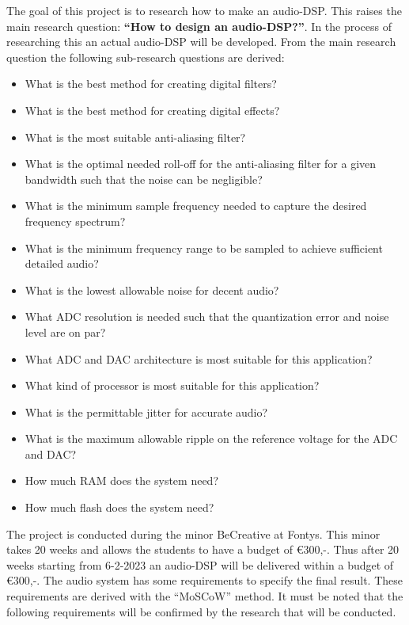 The goal of this project is to research how to make an audio-DSP. This raises the main research question: \textbf{“How to design an audio-DSP?”}. In the process of researching this an actual audio-DSP will be developed. From the main research question the following sub-research questions are derived:
\begin{itemize} %
	\setlength\itemsep{-0.2em} %
	\item What is the best method for creating digital filters?
	\item What is the best method for creating digital effects?
	\item What is the most suitable anti-aliasing filter?
	\item What is the optimal needed roll-off for the anti-aliasing filter for a given bandwidth such that the noise can be negligible?
	\item What is the minimum sample frequency needed to capture the desired frequency spectrum?
	\item What is the minimum frequency range to be sampled to achieve sufficient detailed audio?
	\item What is the lowest allowable noise for decent audio?
	\item What ADC resolution is needed such that the quantization error and noise level are on par?
	\item What ADC and DAC architecture is most suitable for this application?
	\item What kind of processor is most suitable for this application?
	\item What is the permittable jitter for accurate audio?
	\item What is the maximum allowable ripple on the reference voltage for the ADC and DAC?
	\item How much RAM does the system need?
	\item How much flash does the system need?\\
\end{itemize}

\noindent
The project is conducted during the minor BeCreative at Fontys. This minor takes 20 weeks and allows the students to have a budget of €300,-. Thus after 20 weeks starting from 6-2-2023 an audio-DSP will be delivered within a budget of €300,-.
The audio system has some requirements to specify the final result. These requirements are derived with the “MoSCoW” method. It must be noted that the following requirements will be confirmed by the research that will be conducted.


